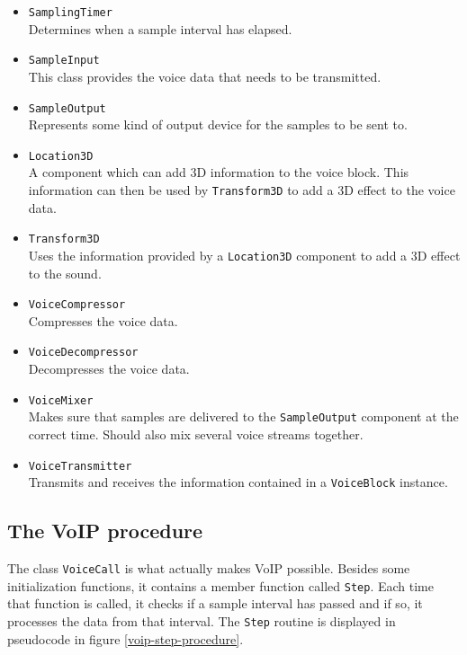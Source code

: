 		\begin{itemize}
		\item {\tt SamplingTimer}\\
			Determines when a sample interval has elapsed.
		
		\item {\tt SampleInput}\\
			This class provides the voice data that needs to be transmitted.
		
		\item {\tt SampleOutput}\\
			Represents some kind of output device for the samples to be sent
			to.
		
		\item {\tt Location3D}\\
			A component which can add 3D information to the voice block. This
			information can then be used by {\tt Transform3D} to add a 3D
			effect to the voice data.
		
		\item {\tt Transform3D}\\
			Uses the information provided by a {\tt Location3D} component
			to add a 3D effect to the sound.
		
		\item {\tt VoiceCompressor}\\
			Compresses the voice data.
		
		\item {\tt VoiceDecompressor}\\
			Decompresses the voice data.
		
		\item {\tt VoiceMixer}\\
			Makes sure that samples are delivered to the {\tt SampleOutput}
			component at the correct time. Should also mix several voice
			streams together.
		
		\item {\tt VoiceTransmitter}\\
			Transmits and receives the information contained in a {\tt VoiceBlock}
			instance.
		\end{itemize}
		
		\subsection{The VoIP procedure}\label{text-voipframework-voipprocedure}
		
		The class {\tt VoiceCall} is what actually makes VoIP possible. Besides some
		initialization functions, it contains a member function called {\tt Step}. Each
		time that function is called, it checks if a sample interval has passed and if
		so, it processes the data from that interval. The {\tt Step} routine is displayed
		in pseudocode in figure \ref{voip-step-procedure}.
		
